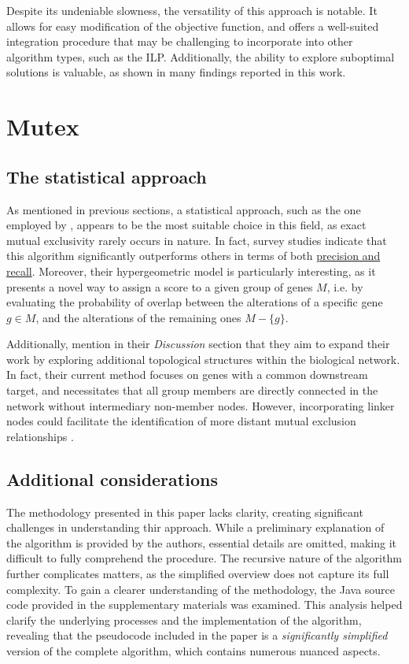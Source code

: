 Despite its undeniable slowness, the versatility of this approach is notable. It allows for easy modification of the objective function, and offers a well-suited integration procedure that may be challenging to incorporate into other algorithm types, such as the ILP. Additionally, the ability to explore suboptimal solutions is valuable, as shown in many findings reported in this work.

\section{Mutex}

\subsection{The statistical approach}

As mentioned in previous sections, a statistical approach, such as the one employed by \textcite{mutex}, appears to be the most suitable choice in this field, as exact mutual exclusivity rarely occurs in nature. In fact, survey studies \cite{survey} indicate that this algorithm significantly outperforms others in terms of both \href{https://en.wikipedia.org/wiki/Precision_and_recall}{precision and recall}. Moreover, their hypergeometric model is particularly interesting, as it presents a novel way to assign a score to a given group of genes $M$, i.e. by evaluating the probability of overlap between the alterations of a specific gene $g \in M$, and the alterations of the remaining ones $M-\{g\}$.

Additionally, \textcite{mutex} mention in their \textit{Discussion} section that they aim to expand their work by exploring additional topological structures within the biological network. In fact, their current method focuses on genes with a common downstream target, and necessitates that all group members are directly connected in the network without intermediary non-member nodes. However, incorporating linker nodes could facilitate the identification of more distant mutual exclusion relationships \cite{mutex}.

\subsection{Additional considerations}

The methodology presented in this paper lacks clarity, creating significant challenges in understanding thir approach. While a preliminary explanation of the algorithm is provided by the authors, essential details are omitted, making it difficult to fully comprehend the procedure. The recursive nature of the algorithm further complicates matters, as the simplified overview does not capture its full complexity. To gain a clearer understanding of the methodology, the Java source code provided in the supplementary materials was examined. This analysis helped clarify the underlying processes and the implementation of the algorithm, revealing that the pseudocode included in the paper is a \textit{significantly simplified} version of the complete algorithm, which contains numerous nuanced aspects.

